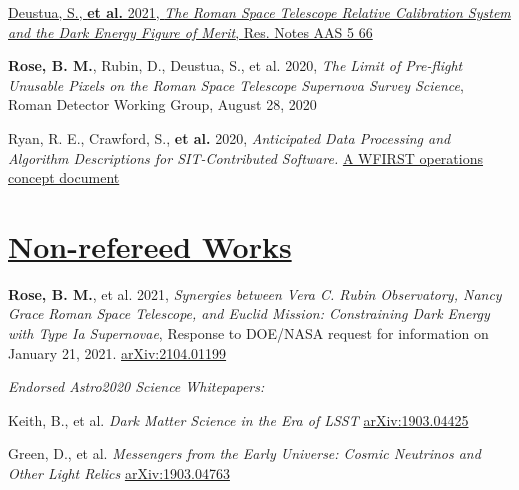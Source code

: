 \documentclass[margin]{res}
\begin{document}
\begin{resume}
\hangindent=15pt 
\href{iopscience.iop.org/article/10.3847/2515-5172/abf1fb}{Deustua, S., \textbf{et al.} 2021, {\sl The Roman Space Telescope Relative Calibration System and the Dark Energy Figure of Merit}, Res. Notes AAS 5 66}
\vspace{-12pt}

\hangindent=15pt 
\textbf{Rose, B. M.}, Rubin, D., Deustua, S., et al. 2020, {\sl The Limit of Pre-flight Unusable Pixels on the Roman Space Telescope Supernova Survey Science}, Roman Detector Working Group, August 28, 2020
\vspace{-12pt}

\hangindent=15pt 
Ryan, R. E., Crawford, S., \textbf{et al.} 2020, {\sl Anticipated Data Processing and Algorithm Descriptions for SIT-Contributed Software.} \href{https://outerspace.stsci.edu/display/FWG/Anticipated+Data+Processing+and+Algorithm+Descriptions+for+SIT-Contributed+Software}{A WFIRST operations concept document}


\section{\href{https://ui.adsabs.harvard.edu/\#search/q=orcid\%3A\%220000-0002-1873-8973\%22&sort=date\%20desc\%2C\%20bibcode\%20desc}{Non-refereed Works}}

\hangindent=15pt 
\textbf{Rose, B. M.}, et al. 2021, {\sl Synergies between Vera C. Rubin Observatory, Nancy Grace Roman Space Telescope, and Euclid Mission: Constraining Dark Energy with Type Ia Supernovae}, Response to DOE/NASA request for information on January 21, 2021. \href{https://arxiv.org/abs/2104.01199}{arXiv:2104.01199}
\vspace{-12pt}


\textit{Endorsed Astro2020 Science Whitepapers:}

\vspace{-12pt}\hspace{15pt}\hangindent=30pt 
Keith, B., et al. \textit{Dark Matter Science in the Era of LSST}
\href{https://ui.adsabs.harvard.edu/abs/2019arXiv190304425B/abstract}{arXiv:1903.04425}

\vspace{-12pt}\hspace{15pt}\hangindent=30pt 
Green, D., et al. \textit{Messengers from the Early Universe: Cosmic Neutrinos and Other Light Relics}
\href{https://ui.adsabs.harvard.edu/abs/2019arXiv190304763G/abstract}{arXiv:1903.04763}


\end{resume}
\end{document}
